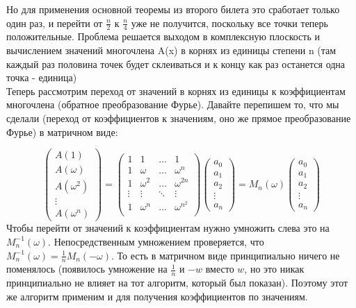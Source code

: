 \noindent Но для применения основной теоремы из второго билета это сработает только один раз, и перейти от $\frac n 2$ к $\frac n 4$ уже не получится, поскольку все точки теперь положительные. Проблема решается выходом в комплексную плоскость и вычислением значений многочлена A(x) в корнях из единицы степени n (там каждый раз половина точек будет склеиваться и к концу как раз останется одна точка - единица) \\

\noindent Теперь рассмотрим переход от значений в корнях из единицы к коэффициентам многочлена (обратное преобразование Фурье). Давайте перепишем то, что мы сделали (переход от коэффициентов к значениям, оно же прямое преобразование Фурье) в матричном виде:

\begin{equation*}
\left(
\begin{array}{c}
A(1) \\
A(\omega) \\
A(\omega^2) \\
\vdots \\
A(\omega^n) 
\end{array}
\right)
= 
\left(
\begin{array}{cccc}
1 & 1 & \ldots & 1 \\
1 & \omega & \ldots & \omega^n \\
1 & \omega^2 & \ldots & \omega^{2n}\\
\vdots & \vdots & \ddots & \vdots\\
1 & \omega^{n} & \ldots & \omega^{n^2} \\
\end{array}
\right)
\left(
\begin{array}{c}
a_0 \\
a_1 \\
a_2 \\
\vdots \\
a_n 
\end{array}
\right)
= M_n (\omega)
\left(
\begin{array}{c}
a_0 \\
a_1 \\
a_2 \\
\vdots \\
a_n 
\end{array}
\right)
\end{equation*}
Чтобы перейти от значений к коэффициентам нужно умножить слева это на $M_n^{-1} (\omega)$. Непосредственным умножением проверяется, что $M_n^{-1} (\omega) = \frac{1}{n} M_n (-\omega)$. То есть в матричном виде принципиально ничего не поменялось (появилось умножение на $\frac{1}{n}$ и $-w$ вместо $w$, но это никак принципиально не влияет на тот алгоритм, который был показан). Поэтому этот же алгоритм применим и для получения коэффициентов по значениям.

